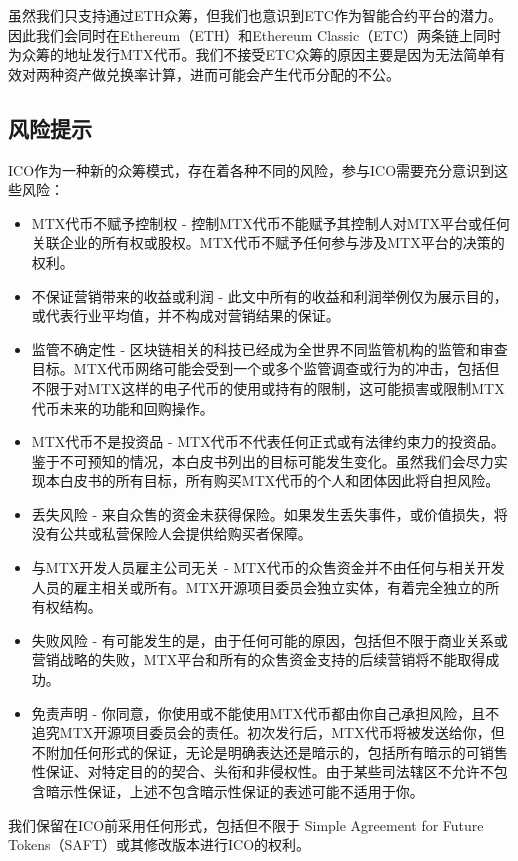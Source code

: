 \documentclass[UTF8,nofonts]{ctexart}
\begin{document}
\begin{appendices}
虽然我们只支持通过ETH众筹，但我们也意识到ETC作为智能合约平台的潜力。因此我们会同时在Ethereum（ETH）和Ethereum Classic（ETC）两条链上同时为众筹的地址发行MTX代币。我们不接受ETC众筹的原因主要是因为无法简单有效对两种资产做兑换率计算，进而可能会产生代币分配的不公。


\subsection{风险提示\label{sec:risks}}

ICO作为一种新的众筹模式，存在着各种不同的风险，参与ICO需要充分意识到这些风险：
\begin{itemize}
	\item MTX代币不赋予控制权 - 控制MTX代币不能赋予其控制人对MTX平台或任何关联企业的所有权或股权。MTX代币不赋予任何参与涉及MTX平台的决策的权利。
	\item 不保证营销带来的收益或利润 - 此文中所有的收益和利润举例仅为展示目的，或代表行业平均值，并不构成对营销结果的保证。
	\item 监管不确定性 - 区块链相关的科技已经成为全世界不同监管机构的监管和审查目标。MTX代币网络可能会受到一个或多个监管调查或行为的冲击，包括但不限于对MTX这样的电子代币的使用或持有的限制，这可能损害或限制MTX代币未来的功能和回购操作。
	\item MTX代币不是投资品 - MTX代币不代表任何正式或有法律约束力的投资品。鉴于不可预知的情况，本白皮书列出的目标可能发生变化。虽然我们会尽力实现本白皮书的所有目标，所有购买MTX代币的个人和团体因此将自担风险。
	\item 丢失风险 - 来自众售的资金未获得保险。如果发生丢失事件，或价值损失，将没有公共或私营保险人会提供给购买者保障。
	\item 与MTX开发人员雇主公司无关 - MTX代币的众售资金并不由任何与相关开发人员的雇主相关或所有。MTX开源项目委员会独立实体，有着完全独立的所有权结构。
	\item 失败风险 - 有可能发生的是，由于任何可能的原因，包括但不限于商业关系或营销战略的失败，MTX平台和所有的众售资金支持的后续营销将不能取得成功。
	\item 免责声明 - 你同意，你使用或不能使用MTX代币都由你自己承担风险，且不追究MTX开源项目委员会的责任。初次发行后，MTX代币将被发送给你，但不附加任何形式的保证，无论是明确表达还是暗示的，包括所有暗示的可销售性保证、对特定目的的契合、头衔和非侵权性。由于某些司法辖区不允许不包含暗示性保证，上述不包含暗示性保证的表述可能不适用于你。
\end{itemize}


我们保留在ICO前采用任何形式，包括但不限于 Simple Agreement for Future Tokens（SAFT）或其修改版本进行ICO的权利。

\end{appendices}
\end{document}
